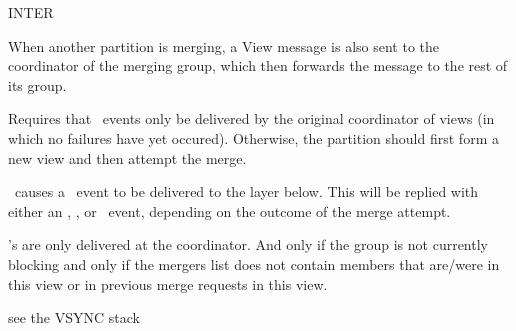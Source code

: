 \begin{Layer}{INTER}
\begin{Properties}
\item
When another partition is merging, a View message is also sent to the coordinator of
the merging group, which then forwards the message to the rest of its group.
\item 
Requires that \DnMerge\ events only be delivered by the original coordinator of views
(in which no failures have yet occured).  Otherwise, the partition should first form
a new view and then attempt the merge.
\item
\DnMerge\ causes a \DnMerge\ event to be delivered to the layer below.  This
will be replied with either an \UpView, \UpMergeFailed, or \UpMergeDenied\
event, depending on the outcome of the merge attempt.
\item
\UpMergeRequest's are only delivered at the coordinator.  And only if the
group is not currently blocking and only if the mergers list does not
contain members that are/were in this view or in previous merge requests in
this view.
\end{Properties}

\begin{Sources}
\end{Sources}

\begin{GenEvent}
\genevent{\DnMerge}
\genevent{\DnMergeDenied}
\genevent{\DnSuspect}
\end{GenEvent}

\begin{Testing}
\item
see the VSYNC stack
\end{Testing}
\end{Layer}

